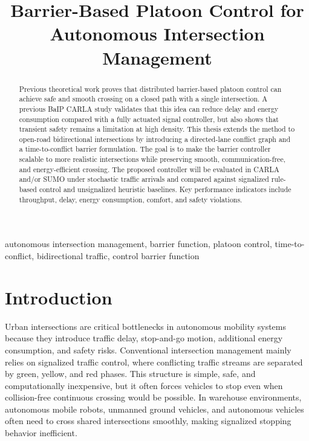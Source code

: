 \documentclass[conference]{IEEEtran}
\begin{document}
\title{Barrier-Based Platoon Control for Autonomous Intersection Management}

\author{
\and
{}
}

\maketitle

\begin{abstract}
Previous theoretical work proves that distributed barrier-based platoon control can achieve safe and smooth crossing on a closed path with a single intersection. A previous BaIP CARLA study validates that this idea can reduce delay and energy consumption compared with a fully actuated signal controller, but also shows that transient safety remains a limitation at high density. This thesis extends the method to open-road bidirectional intersections by introducing a directed-lane conflict graph and a time-to-conflict barrier formulation. The goal is to make the barrier controller scalable to more realistic intersections while preserving smooth, communication-free, and energy-efficient crossing. The proposed controller will be evaluated in CARLA and/or SUMO under stochastic traffic arrivals and compared against signalized rule-based control and unsignalized heuristic baselines. Key performance indicators include throughput, delay, energy consumption, comfort, and safety violations.
\end{abstract}

\begin{IEEEkeywords}
autonomous intersection management, barrier function, platoon control, time-to-conflict, bidirectional traffic, control barrier function
\end{IEEEkeywords}

\section{Introduction}
Urban intersections are critical bottlenecks in autonomous mobility systems because they introduce traffic delay, stop-and-go motion, additional energy consumption, and safety risks. Conventional intersection management mainly relies on signalized traffic control, where conflicting traffic streams are separated by green, yellow, and red phases. This structure is simple, safe, and computationally inexpensive, but it often forces vehicles to stop even when collision-free continuous crossing would be possible. In warehouse environments, autonomous mobile robots, unmanned ground vehicles, and autonomous vehicles often need to cross shared intersections smoothly, making signalized stopping behavior inefficient.
\end{document}
